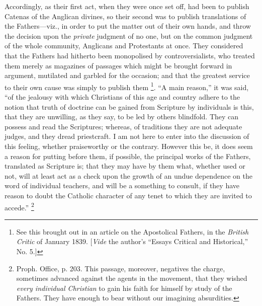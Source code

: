 Accordingly, as their first act, when they were once set off, had
been to publish Catenas of the Anglican divines, so their second was
to publish translations of the Fathers—viz., in order to put the
matter out of their own hands, and throw the decision upon the \emph{private}
judgment of no one, but on the common judgment of the whole community,
Anglicans and Protestants at once. They considered that the Fathers
had hitherto been monopolised by controversialists, who treated them
merely as magazines of passages which might be brought forward in
argument, mutilated and garbled for the occasion; and that the
greatest service to their own cause was simply to publish them \footnote{See this brought out in an article on the
Apostolical Fathers, in the \emph{British Critic} of January 1839. [\emph{Vide}
the author's ``Essays Critical and
Historical,'' No. 5.]}. ``A main reason,'' it was said, ``of the jealousy
with which Christians of this age and country adhere to the notion
that truth of doctrine can be gained from Scripture by individuals is
this, that they are unwilling, as they say, to be led by others
blindfold. They can possess and read the Scriptures; whereas, of
traditions they are not adequate judges, and they dread priestcraft. I
am not here to enter into the discussion of this feeling, whether
praiseworthy or the contrary. However this be, it does seem a reason
for putting before them, if possible, the principal works of the
Fathers, translated as Scripture is; that they may have by them what,
whether used or not, will at least act as a check upon the growth of
an undue dependence on the word of individual teachers, and will be a
something to consult, if they have reason to doubt the Catholic
character of any tenet to which they are invited to accede.'' \footnote{Proph. Office, p. 203. This passage,
moreover, negatives the charge, sometimes advanced against the agents
in the movement, that they wished \emph{every individual Christian} to
gain his faith for himself by study of the Fathers. They have enough
to bear without our imagining absurdities.}

